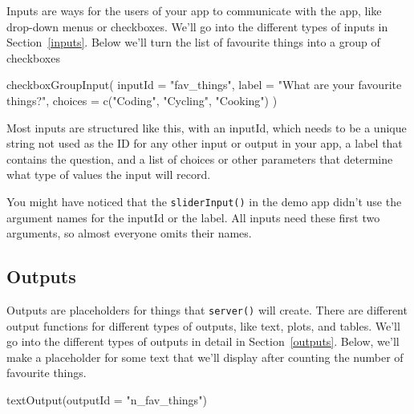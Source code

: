 \documentclass[
  oneside]{book}
\newenvironment{Shaded}{\begin{snugshade}}{\end{snugshade}}
\newcommand{\AttributeTok}[1]{\textcolor[rgb]{0.77,0.63,0.00}{#1}}
\newcommand{\FunctionTok}[1]{\textcolor[rgb]{0.00,0.00,0.00}{#1}}
\newcommand{\NormalTok}[1]{#1}
\newcommand{\StringTok}[1]{\textcolor[rgb]{0.31,0.60,0.02}{#1}}
\begin{document}
Inputs are ways for the users of your app to communicate with the app, like drop-down menus or checkboxes. We'll go into the different types of inputs in Section~\ref{inputs}. Below we'll turn the list of favourite things into a group of checkboxes

\begin{Shaded}
\begin{Highlighting}[]
\FunctionTok{checkboxGroupInput}\NormalTok{(}
  \AttributeTok{inputId =} \StringTok{"fav\_things"}\NormalTok{,}
  \AttributeTok{label =} \StringTok{"What are your favourite things?"}\NormalTok{,}
  \AttributeTok{choices =} \FunctionTok{c}\NormalTok{(}\StringTok{"Coding"}\NormalTok{, }\StringTok{"Cycling"}\NormalTok{, }\StringTok{"Cooking"}\NormalTok{)}
\NormalTok{)}
\end{Highlighting}
\end{Shaded}

Most inputs are structured like this, with an \AttributeTok{inputId}, which needs to be a unique string not used as the ID for any other input or output in your app, a \AttributeTok{label} that contains the question, and a list of \AttributeTok{choices} or other parameters that determine what type of values the input will record.

\begin{info}
You might have noticed that the \texttt{sliderInput}\texttt{()} in the demo app didn't use the argument names for the \AttributeTok{inputId} or the \AttributeTok{label}. All inputs need these first two arguments, so almost everyone omits their names.

\end{info}

\hypertarget{outputs-intro}{%
\subsection{Outputs}\label{outputs-intro}}

Outputs are placeholders for things that \texttt{server}\texttt{()} will create. There are different output functions for different types of outputs, like text, plots, and tables. We'll go into the different types of outputs in detail in Section~\ref{outputs}. Below, we'll make a placeholder for some text that we'll display after counting the number of favourite things.

\begin{Shaded}
\begin{Highlighting}[]
\FunctionTok{textOutput}\NormalTok{(}\AttributeTok{outputId =} \StringTok{"n\_fav\_things"}\NormalTok{)}
\end{Highlighting}
\end{Shaded}
\end{document}
